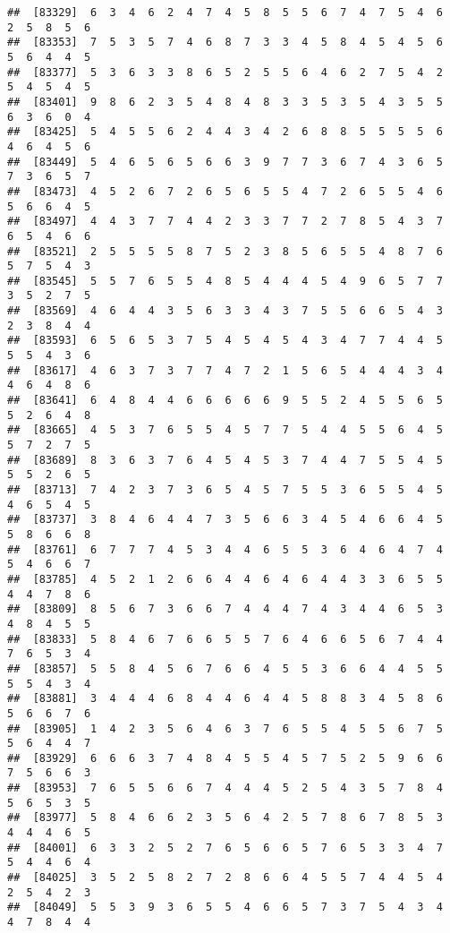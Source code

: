 \documentclass[
]{book}
\begin{document}
\begin{verbatim}
##  [83329]  6  3  4  6  2  4  7  4  5  8  5  5  6  7  4  7  5  4  6  2  5  8  5  6
##  [83353]  7  5  3  5  7  4  6  8  7  3  3  4  5  8  4  5  4  5  6  5  6  4  4  5
##  [83377]  5  3  6  3  3  8  6  5  2  5  5  6  4  6  2  7  5  4  2  5  4  5  4  5
##  [83401]  9  8  6  2  3  5  4  8  4  8  3  3  5  3  5  4  3  5  5  6  3  6  0  4
##  [83425]  5  4  5  5  6  2  4  4  3  4  2  6  8  8  5  5  5  5  6  4  6  4  5  6
##  [83449]  5  4  6  5  6  5  6  6  3  9  7  7  3  6  7  4  3  6  5  7  3  6  5  7
##  [83473]  4  5  2  6  7  2  6  5  6  5  5  4  7  2  6  5  5  4  6  5  6  6  4  5
##  [83497]  4  4  3  7  7  4  4  2  3  3  7  7  2  7  8  5  4  3  7  6  5  4  6  6
##  [83521]  2  5  5  5  5  8  7  5  2  3  8  5  6  5  5  4  8  7  6  5  7  5  4  3
##  [83545]  5  5  7  6  5  5  4  8  5  4  4  4  5  4  9  6  5  7  7  3  5  2  7  5
##  [83569]  4  6  4  4  3  5  6  3  3  4  3  7  5  5  6  6  5  4  3  2  3  8  4  4
##  [83593]  6  5  6  5  3  7  5  4  5  4  5  4  3  4  7  7  4  4  5  5  5  4  3  6
##  [83617]  4  6  3  7  3  7  7  4  7  2  1  5  6  5  4  4  4  3  4  4  6  4  8  6
##  [83641]  6  4  8  4  4  6  6  6  6  6  9  5  5  2  4  5  5  6  5  5  2  6  4  8
##  [83665]  4  5  3  7  6  5  5  4  5  7  7  5  4  4  5  5  6  4  5  5  7  2  7  5
##  [83689]  8  3  6  3  7  6  4  5  4  5  3  7  4  4  7  5  5  4  5  5  5  2  6  5
##  [83713]  7  4  2  3  7  3  6  5  4  5  7  5  5  3  6  5  5  4  5  4  6  5  4  5
##  [83737]  3  8  4  6  4  4  7  3  5  6  6  3  4  5  4  6  6  4  5  5  8  6  6  8
##  [83761]  6  7  7  7  4  5  3  4  4  6  5  5  3  6  4  6  4  7  4  5  4  6  6  7
##  [83785]  4  5  2  1  2  6  6  4  4  6  4  6  4  4  3  3  6  5  5  4  4  7  8  6
##  [83809]  8  5  6  7  3  6  6  7  4  4  4  7  4  3  4  4  6  5  3  4  8  4  5  5
##  [83833]  5  8  4  6  7  6  6  5  5  7  6  4  6  6  5  6  7  4  4  7  6  5  3  4
##  [83857]  5  5  8  4  5  6  7  6  6  4  5  5  3  6  6  4  4  5  5  5  5  4  3  4
##  [83881]  3  4  4  4  6  8  4  4  6  4  4  5  8  8  3  4  5  8  6  5  6  6  7  6
##  [83905]  1  4  2  3  5  6  4  6  3  7  6  5  5  4  5  5  6  7  5  5  6  4  4  7
##  [83929]  6  6  6  3  7  4  8  4  5  5  4  5  7  5  2  5  9  6  6  7  5  6  6  3
##  [83953]  7  6  5  5  6  6  7  4  4  4  5  2  5  4  3  5  7  8  4  5  6  5  3  5
##  [83977]  5  8  4  6  6  2  3  5  6  4  2  5  7  8  6  7  8  5  3  4  4  4  6  5
##  [84001]  6  3  3  2  5  2  7  6  5  6  6  5  7  6  5  3  3  4  7  5  4  4  6  4
##  [84025]  3  5  2  5  8  2  7  2  8  6  6  4  5  5  7  4  4  5  4  2  5  4  2  3
##  [84049]  5  5  3  9  3  6  5  5  4  6  6  5  7  3  7  5  4  3  4  4  7  8  4  4

\end{verbatim}
\end{document}
